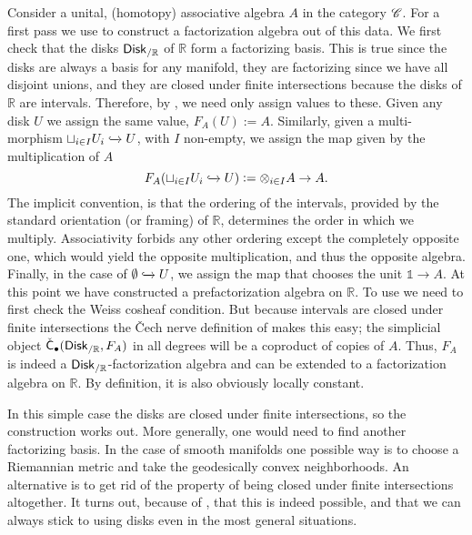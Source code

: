 \documentclass[../text]{subfiles}
\begin{document}
\begin{construction}\label{con:lcfas_on_R}
    Consider a unital, (homotopy) associative algebra $A$ in the category $\mathscr{C}$. For a first pass we use \cite[\S7.2]{cg2016} to construct a factorization algebra out of this data. We first check that the disks $\disk[r]_{/\mathbb{R}}$ of $\mathbb{R}$ form a factorizing basis. This is true since the disks are always a basis for any manifold, they are factorizing since we have all disjoint unions, and they are closed under finite intersections because the disks of $\mathbb{R}$ are intervals. Therefore, by \cite[\S7.2]{cg2016}, we need only assign values to these. Given any disk $U$ we assign the same value, $F_A(U) := A$. Similarly, given a multi-morphism $\sqcup_{i \in I} U_i \xhookrightarrow{} U$, with $I$ non-empty, we assign the map given by the multiplication of $A$
    \begin{equation}
        F_A(\sqcup_{i \in I} U_i \xhookrightarrow{} U) := \otimes_{i \in I} A \rightarrow A.
    \end{equation}
    The implicit convention, is that the ordering of the intervals, provided by the standard orientation (or framing) of $\mathbb{R}$, determines the order in which we multiply. Associativity forbids any other ordering except the completely opposite one, which would yield the opposite multiplication, and thus the opposite algebra. Finally, in the case of $\emptyset \xhookrightarrow{} U$, we assign the map that chooses the unit $\mathbb{1} \rightarrow A$. At this point we have constructed a prefactorization algebra on $\mathbb{R}$. To use \cite[\S7.2]{cg2016} we need to first check the Weiss cosheaf condition. But because intervals are closed under finite intersections the \v{C}ech nerve definition of  makes this easy; the simplicial object $\cech_{\bullet}(\disk[r]_{/\mathbb{R}}, F_A)$ in all degrees will be a coproduct of copies of $A$. Thus, $F_A$ is indeed a $\disk[r]_{/\mathbb{R}}$-factorization algebra and can be extended to a factorization algebra on $\mathbb{R}$. By definition, it is also obviously locally constant.

    In this simple case the disks are closed under finite intersections, so the construction works out. More generally, one would need to find another factorizing basis. In the case of smooth manifolds one possible way is to choose a Riemannian metric and take the geodesically convex neighborhoods. An alternative is to get rid of the property of being closed under finite intersections altogether. It turns out, because of , that this is indeed possible, and that we can always stick to using disks even in the most general situations.


\end{construction}
\end{document}
